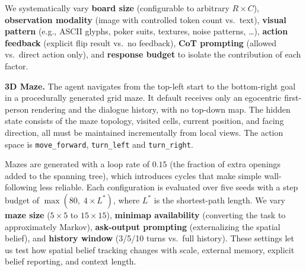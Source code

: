 \documentclass{llmxive}
\providecommand{\paragraph}[1]{\vspace{1mm}\noindent\textbf{#1}}
\begin{document}
We systematically vary \textbf{board size} (configurable to arbitrary $R{\times}C$), \textbf{observation modality} (image with controlled token count vs.\ text), \textbf{visual pattern} (e.g., ASCII glyphs, poker suits, textures, noise patterns, \ldots), \textbf{action feedback} (explicit flip result vs.\ no feedback), \textbf{CoT prompting} (allowed vs.\ direct action only), and \textbf{response budget} to isolate the contribution of each factor.



\paragraph{3D Maze.}
The agent navigates from the top-left start to the bottom-right goal in a procedurally generated grid maze. It default receives only an egocentric first-person rendering and the dialogue history, with no top-down map. The hidden state consists of the maze topology, visited cells, current position, and facing direction, all must be maintained incrementally from local views. The action space is \texttt{move\_forward}, \texttt{turn\_left} and \texttt{turn\_right}. 

Mazes are generated with a loop rate of $0.15$ (the fraction of extra openings added to the spanning tree), which introduces cycles that make simple wall-following less reliable. Each configuration is evaluated over five seeds with a step budget of $\max(80,\;4{\times}L^*)$, where $L^*$ is the shortest-path length. We vary \textbf{maze size} ($5{\times}5$ to $15{\times}15$), \textbf{minimap availability} (converting the task to approximately Markov), \textbf{ask-output prompting} (externalizing the spatial belief), and \textbf{history window} (3/5/10 turns vs.\ full history). These settings let us test how spatial belief tracking changes with scale, external memory, explicit belief reporting, and context length.
\end{document}
